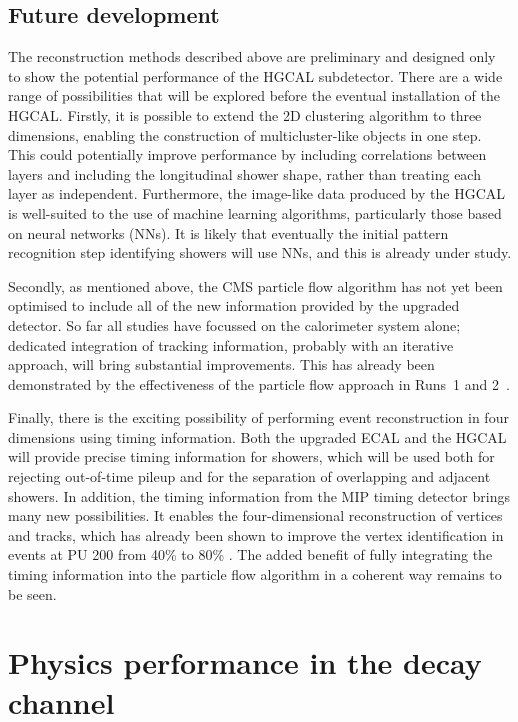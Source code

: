 \subsection{Future development}
The reconstruction methods described above are preliminary and designed only to show the potential performance of the HGCAL subdetector.
There are a wide range of possibilities that will be explored before the eventual installation of the HGCAL.
Firstly, it is possible to extend the 2D clustering algorithm to three dimensions, enabling the construction of multicluster-like objects in one step.
This could potentially improve performance by including correlations between layers and including the longitudinal shower shape, 
rather than treating each layer as independent.
Furthermore, the image-like data produced by the HGCAL is well-suited to the use of machine learning algorithms, particularly those based on neural networks (NNs).
It is likely that eventually the initial pattern recognition step identifying showers will use NNs, and this is already under study.

Secondly, as mentioned above, the CMS particle flow algorithm has not yet been optimised to include all of the new information provided by the upgraded detector.
So far all studies have focussed on the calorimeter system alone; dedicated integration of tracking information, 
probably with an iterative approach, will bring substantial improvements.
This has already been demonstrated by the effectiveness of the particle flow approach in Runs~1 and 2~\cite{ParticleFlow}.

Finally, there is the exciting possibility of performing event reconstruction in four dimensions using timing information.
Both the upgraded ECAL and the HGCAL will provide precise timing information for showers, 
which will be used both for rejecting out-of-time pileup and for the separation of overlapping and adjacent showers.
In addition, the timing information from the MIP timing detector brings many new possibilities. 
It enables the four-dimensional reconstruction of vertices and tracks, 
which has already been shown to improve the vertex identification in \Hgg events at PU 200 from 40\% to 80\% \cite{MTD}.
The added benefit of fully integrating the timing information into the particle flow algorithm in a coherent way remains to be seen.

\section{Physics performance in the \Hgg decay channel}
\label{sec:hgcal_physics}

